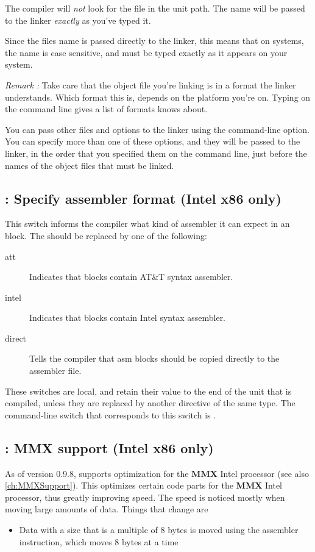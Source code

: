 \documentclass{report}
\begin{document}
The compiler will {\em not} look for the file in the unit path.
The name will be passed to the linker {\em exactly} as you've typed it.

Since the files name is passed directly to the linker, this means that on
\linux systems, the name is case sensitive, and must be typed exactly as it
appears on your system.

{\em Remark :} Take care that the object file you're linking is in a
format the linker understands. Which format this is, depends on the platform
you're on. Typing  on the command line gives a list of formats
 knows about.

You can pass other files and options to the linker using the 
command-line option. You can specify more than one of these options, and
they will be passed to the linker, in the order that you specified them on
the command line, just before the names of the object files that must be
linked.

\subsection{ : Specify assembler format (Intel x86 only)}
This switch informs the compiler what kind of assembler it can expect in an
 block. The  should be replaced by one of the following:
\begin{description}
\item [att\ ] Indicates that  blocks contain AT\&T syntax assembler.
\item [intel\ ] Indicates that  blocks contain Intel syntax
assembler.
\item [direct\ ] Tells the compiler that asm blocks should be copied
directly to the assembler file.
\end{description}
These switches are local, and retain their value to the end of the unit that
is compiled, unless they are replaced by another directive of the same type.
The command-line switch that corresponds to this switch is .


\subsection{ : MMX support (Intel x86 only)}
As of version 0.9.8, \fpc supports optimization for the \textbf{MMX} Intel
processor (see also \ref{ch:MMXSupport}). This optimizes certain code parts for the \textbf{MMX} Intel
processor, thus greatly improving speed. The speed is noticed mostly when
moving large amounts of data. Things that change are
\begin{itemize}
\item Data with a size that is a multiple of 8 bytes is moved using the
 assembler instruction, which moves 8 bytes at a time
\end{itemize}
\end{document}

